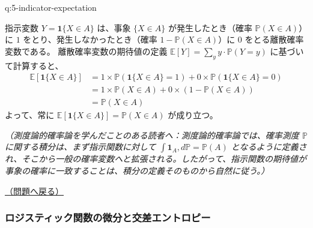 \documentclass[
  pandoc]{bxjsarticle}
\newcommand{\ind}{\mathbf{1}}
\begin{document}
\begin{answerbox}[phantomlabel=a:5-indicator-expectation]{q:5-indicator-expectation}

指示変数 \(Y = \ind\{X \in A\}\) は、事象 \(\{X \in A\}\)
が発生したとき（確率 \(\mathbb{P}(X \in A)\)）に \(1\)
をとり、発生しなかったとき（確率 \(1 - \mathbb{P}(X \in A)\)）に \(0\)
をとる離散確率変数である。 離散確率変数の期待値の定義
\(\mathbb{E}[Y] = \sum_{y} y \cdot \mathbb{P}(Y = y)\)
に基づいて計算すると、 \begin{align*}
\mathbb{E}[\ind\{X \in A\}] &= 1 \times \mathbb{P}(\ind\{X \in A\} = 1) + 0 \times \mathbb{P}(\ind\{X \in A\} = 0) \\
&= 1 \times \mathbb{P}(X \in A) + 0 \times (1 - \mathbb{P}(X \in A)) \\
&= \mathbb{P}(X \in A)
\end{align*} よって、常に
\(\mathbb{E}[\ind\{X \in A\}] = \mathbb{P}(X \in A)\) が成り立つ。

\smallskip

\noindent\textit{（測度論的確率論を学んだことのある読者へ：測度論的確率論では、確率測度 $\mathbb{P}$ に関する積分は、まず指示関数に対して $\int \ind_A,d\mathbb{P}=\mathbb{P}(A)$ となるように定義され、そこから一般の確率変数へと拡張される。したがって、指示関数の期待値が事象の確率に一致することは、積分の定義そのものから自然に従う。）}

\hfill 

\hyperref[q:5-indicator-expectation]{（問題へ戻る）}

\end{answerbox}

\subsubsection{ロジスティック関数の微分と交差エントロピー}\label{ux30edux30b8ux30b9ux30c6ux30a3ux30c3ux30afux95a2ux6570ux306eux5faeux5206ux3068ux4ea4ux5deeux30a8ux30f3ux30c8ux30edux30d4ux30fc-1}
\end{document}
